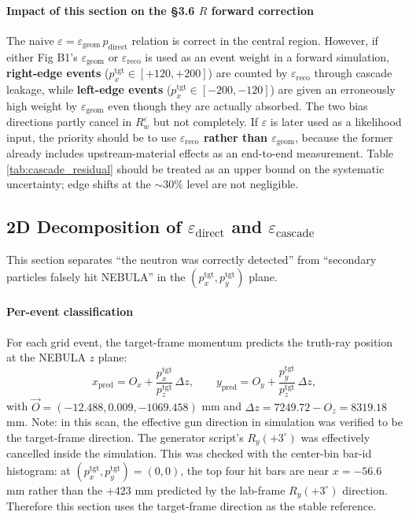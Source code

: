 \documentclass[a4paper,11pt]{article}
\begin{document}
\paragraph{Impact of this section on the \S3.6 $R$ forward correction}
The naive
$\varepsilon = \varepsilon_\mathrm{geom}\,p_\mathrm{direct}$ relation is correct
in the central region. However, if either Fig B1's
$\varepsilon_\mathrm{geom}$ or $\varepsilon_\mathrm{reco}$ is used as an event
weight in a forward simulation, \textbf{right-edge events}
($p_x^\mathrm{tgt}\in[+120,+200]$) are counted by
$\varepsilon_\mathrm{reco}$ through cascade leakage, while \textbf{left-edge
events} ($p_x^\mathrm{tgt}\in[-200,-120]$) are given an erroneously high weight
by $\varepsilon_\mathrm{geom}$ even though they are actually absorbed. The two
bias directions partly cancel in $R_w^\varepsilon$ but not completely. If
$\varepsilon$ is later used as a likelihood input, the priority should be to use
\textbf{$\varepsilon_\mathrm{reco}$ rather than $\varepsilon_\mathrm{geom}$},
because the former already includes upstream-material effects as an end-to-end
measurement. Table \ref{tab:cascade_residual} should be treated as an upper
bound on the systematic uncertainty; edge shifts at the $\sim 30\%$ level are
not negligible.

\subsection{2D Decomposition of
$\varepsilon_\mathrm{direct}$ and $\varepsilon_\mathrm{cascade}$}
\label{sec:direct_vs_cascade_2d}

This section separates ``the neutron was correctly detected'' from ``secondary
particles falsely hit NEBULA'' in the
$(p_x^\mathrm{tgt},p_y^\mathrm{tgt})$ plane.

\paragraph{Per-event classification}
For each grid event, the target-frame momentum predicts the truth-ray position
at the NEBULA $z$ plane:
\[
x_\mathrm{pred} =
O_x + \frac{p_x^\mathrm{tgt}}{p_z^\mathrm{tgt}}\,\Delta z,
\qquad
y_\mathrm{pred} =
O_y + \frac{p_y^\mathrm{tgt}}{p_z^\mathrm{tgt}}\,\Delta z,
\]
with
$\vec O=(-12.488,0.009,-1069.458)$ mm and
$\Delta z = 7249.72 - O_z = 8319.18$ mm.
Note: in this scan, the effective gun direction in simulation was verified to be
the target-frame direction. The generator script's $R_y(+3^\circ)$ was
effectively cancelled inside the simulation. This was checked with the center-bin
bar-id histogram: at
$(p_x^\mathrm{tgt},p_y^\mathrm{tgt})=(0,0)$, the top four hit bars are near
$x=-56.6$ mm rather than the $+423$ mm predicted by the lab-frame
$R_y(+3^\circ)$ direction. Therefore this section uses the target-frame direction
as the stable reference.
\end{document}
